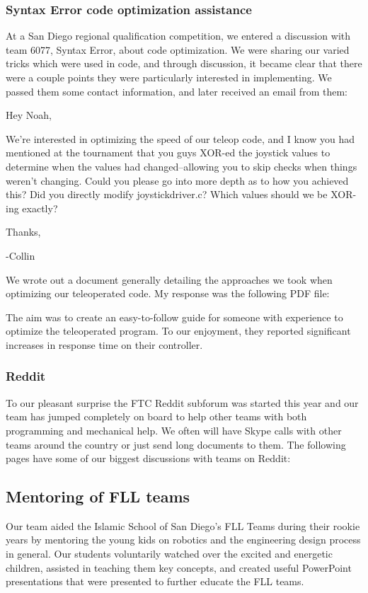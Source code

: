 \subsubsection{Syntax Error code optimization assistance}

At a San Diego regional qualification competition, we entered a discussion with team 6077, Syntax Error, about code optimization. We were sharing our varied tricks which were used in code, and through discussion, it became clear that there were a couple points they were particularly interested in implementing. We passed them some contact information, and later received an email from them:

\begin{fancyquotes}
Hey Noah,

We're interested in optimizing the speed of our teleop code, and I know you had mentioned at the tournament that you guys XOR-ed the joystick values to determine when the values had changed--allowing you to skip checks when things weren't changing. Could you please go into more depth as to how you achieved this? Did you directly modify joystickdriver.c? Which values should we be XOR-ing exactly?

Thanks,

-Collin 
\end{fancyquotes}

We wrote out a document generally detailing the approaches we took when optimizing our teleoperated code. My response was the following PDF file:



The aim was to create an easy-to-follow guide for someone with experience to optimize the teleoperated program. To our enjoyment, they reported significant increases in response time on their controller.

\subsubsection{Reddit}
To our pleasant surprise the FTC Reddit subforum was started this year and our team has jumped completely on board to help other teams with both programming and mechanical help. We often will have Skype calls with other teams around the country or just send long documents to them. The following pages have some of our biggest discussions with teams on Reddit:



\subsection{Mentoring of FLL teams}
Our team aided the Islamic School of San Diego's FLL Teams during their rookie years by mentoring the young kids on robotics and the engineering design process in general. Our students voluntarily watched over the excited and energetic children, assisted in teaching them key concepts, and created useful PowerPoint presentations that were presented to further educate the FLL teams.

